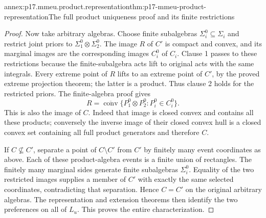 \begin{annexitem}{annex:p17.mmeu.product.representation}{thm:p17-mmeu-product-representation}{The full product uniqueness proof and its finite restrictions}
\begin{proof}
Now take arbitrary algebras.
Choose finite subalgebras
\(\Sigma_i^0\subseteq\Sigma_i\)
and restrict joint priors to
\(\Sigma_1^0\otimes\Sigma_2^0\).
The image \(R\) of \(C'\) is
compact and convex, and its
marginal images are the corresponding
images \(C_i^0\) of \(C_i\).
Clause 1 passes to these restrictions
because the finite-subalgebra acts
lift to original acts with the
same integrals.
Every extreme point of \(R\)
lifts to an extreme point of
\(C'\), by the proved extreme
projection theorem; the latter
is a product. Thus clause 2
holds for the restricted priors.
The finite-algebra proof gives
\[
             R=\overline{\operatorname{conv}}
                       \{P_1^0\otimes P_2^0:P_i^0\in C_i^0\}.
\]
This is also the image of \(C\).
Indeed that image is closed
convex and contains all these
products; conversely the inverse
image of their closed convex
hull is a closed convex set
containing all full product
generators and therefore \(C\).

If \(C\not\subseteq C'\), separate
a point of \(C\setminus C'\)
from \(C'\) by finitely many
event coordinates as above.
Each of these product-algebra
events is a finite union of
rectangles. The finitely many
marginal sides generate finite
subalgebras \(\Sigma_i^0\).
Equality of the two restricted
images supplies a member of \(C'\)
with exactly the same selected
coordinates, contradicting that
separation. Hence \(C=C'\)
on the original arbitrary algebras.
The representation and extension
theorems then identify the two
preferences on all of \(L_u\).
This proves the entire characterization.
\end{proof}
\end{annexitem}

